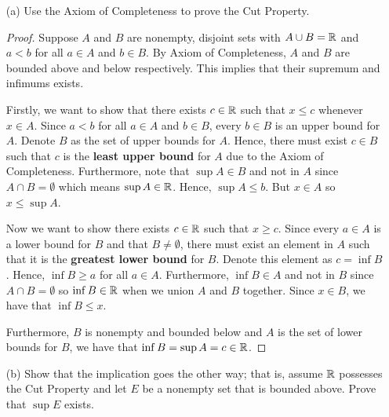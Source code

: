     \begin{enumerate}
    \item[(a)] Use the Axiom of Completeness to prove the Cut Property.
    \begin{proof}
        Suppose \( A \) and \( B \) are nonempty, disjoint sets with \( A \cup B = \mathbb{R} \) and \( a < b \) for all \( a \in A \) and \( b \in B \). By Axiom of Completeness, \( A \) and \( B \) are bounded above and below respectively. This implies that their supremum and infimums exists. 
        
        Firstly, we want to show that there exists \( c \in \mathbb{R} \) such that \( x \leq c \) whenever \( x \in A \). Since \( a < b \) for all \( a \in A\) and \( b \in B \), every \( b \in B \) is an upper bound for \( A \). Denote \( B \) as the set of upper bounds for \( A \). Hence, there must exist \( c \in B \) such that \( c \) is the \textbf{least upper bound} for \( A \) due to the Axiom of Completeness. Furthermore, note that \( \sup A \in B  \) and not in \( A \) since \( A \cap B = \emptyset \) which means \( \sup A \in \mathbb{R} \). Hence, \( \sup A \leq b \). But \( x \in A \) so \( x \leq \sup A \).  
        
        Now we want to show there exists \( c \in \mathbb{R} \) such that \( x \geq c \). Since every \( a \in A \) is a lower bound for \( B \) and that \( B \neq \emptyset \), there must exist an element in \( A  \) such that it is the \textbf{greatest lower bound } for \( B \). Denote this element as \( c = \inf B \). Hence, \( \inf B \geq a \) for all \( a \in A \). Furthermore, \( \inf B \in A \) and not in \( B \) since \( A \cap B = \emptyset\) so \( \inf B \in \mathbb{R} \) when we union \( A \) and \( B \) together. Since \( x \in B \), we have that \( \inf B \leq x  \). 
        
        Furthermore, \( B \) is nonempty and bounded below and \( A \) is the set of lower bounds for \( B \), we have that \( \inf B = \sup A = c \in \mathbb{R} \). 
        \end{proof}
    
        \item[(b)] Show that the implication goes the other way; that is, assume \( \mathbb{R} \) possesses the Cut Property and let \( E \) be a nonempty set that is bounded above. Prove that \( \sup E \) exists.


\end{enumerate}
